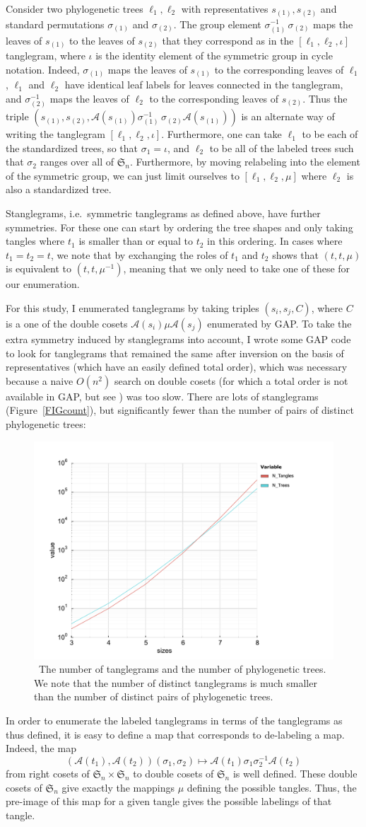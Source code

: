 \documentclass{amsart}
\newcommand{\fS}{\mathfrak S}
\newcommand{\aut}{\mathcal A}
\newcommand{\pairing}{\mu}
\newcommand{\id}{\iota}
\newcommand{\arxiv}[1]{#1}
\newcommand{\FIGcount}{\
\label{FIGcount}
\begin{figure}
  \arxiv{\includegraphics[width=5in]{figures/count}}
\caption{\
  The number of tanglegrams and the number of phylogenetic trees.
  We note that the number of distinct tanglegrams is much smaller than the number of distinct pairs of phylogenetic trees.
}
\end{figure}
}
\begin{document}
Consider two phylogenetic trees $\ell_1, \ell_2$ with representatives $s_{(1)}, s_{(2)}$ and standard permutations $\sigma_{(1)}$ and $\sigma_{(2)}$.
The group element $\sigma_{(1)}^{-1} \, \sigma_{(2)}$ maps the leaves of $s_{(1)}$ to the leaves of $s_{(2)}$ that they correspond as in the $[\ell_1, \ell_2, \id]$ tanglegram, where $\id$ is the identity element of the symmetric group in cycle notation.
Indeed, $\sigma_{(1)}$ maps the leaves of $s_{(1)}$ to the corresponding leaves of $\ell_1$, $\ell_1$ and $\ell_2$ have identical leaf labels for leaves connected in the tanglegram, and $\sigma_{(2)}^{-1}$ maps the leaves of $\ell_2$ to the corresponding leaves of $s_{(2)}$.
Thus the triple $(s_{(1)}, s_{(2)}, \aut(s_{(1)}) \sigma_{(1)}^{-1} \, \sigma_{(2)} \aut(s_{(1)}))$ is an alternate way of writing the tanglegram $[\ell_1, \ell_2, \id]$.
Furthermore, one can take $\ell_1$ to be each of the standardized trees, so that $\sigma_1 = \id$, and $\ell_2$ to be all of the labeled trees such that $\sigma_2$ ranges over all of $\fS_n$.
Furthermore, by moving relabeling into the element of the symmetric group, we can just limit ourselves to $[\ell_1, \ell_2, \pairing]$ where $\ell_2$ is also a standardized tree.

Stanglegrams, i.e.\ symmetric tanglegrams as defined above, have further symmetries.
For these one can start by ordering the tree shapes and only taking tangles where $t_1$ is smaller than or equal to $t_2$ in this ordering.
In cases where $t_1 = t_2 = t$, we note that by exchanging the roles of $t_1$ and $t_2$ shows that $(t, t, \mu)$ is equivalent to $(t, t, \mu^{-1})$, meaning that we only need to take one of these for our enumeration.

For this study, I enumerated tanglegrams by taking triples $(s_i, s_j, C)$, where $C$ is a one of the double cosets $\aut(s_i) \pairing \aut(s_j)$ enumerated by GAP.
To take the extra symmetry induced by stanglegrams into account, I wrote some GAP code to look for tanglegrams that remained the same after inversion on the basis of representatives (which have an easily defined total order), which was necessary because a naive $O(n^2)$ search on double cosets (for which a total order is not available in GAP, but see \cite{Hulpke2003-em}) was too slow.
There are lots of stanglegrams (Figure~\ref{FIGcount}), but significantly fewer than the number of pairs of distinct phylogenetic trees:
\FIGcount

In order to enumerate the labeled tanglegrams in terms of the tanglegrams as thus defined, it is easy to define a map that corresponds to de-labeling a map.
Indeed, the map
\[
(\aut(t_1), \aut(t_2)) (\sigma_1, \sigma_2) \mapsto \aut(t_1) \sigma_1 \sigma_2^{-1} \aut(t_2)
\]
from right cosets of $\fS_n \times \fS_n$ to double cosets of $\fS_n$ is well defined.
These double cosets of $\fS_n$ give exactly the mappings $\pairing$ defining the possible tangles.
Thus, the pre-image of this map for a given tangle gives the possible labelings of that tangle.
\end{document}
